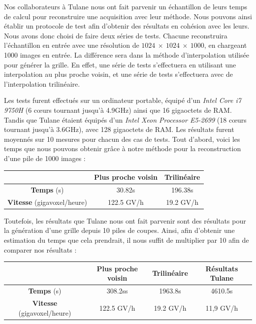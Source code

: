 {{{            Nos collaborateurs à Tulane nous ont fait parvenir un échantillon de leurs temps de calcul pour reconstruire une acquisition avec leur méthode. Nous pouvons ainsi établir un protocole de test afin d'obtenir des résultats en cohésion avec les leurs. Nous avons donc choisi de faire deux séries de tests. Chacune reconstruira l'échantillon en entrée avec une résolution de $1024~\times~1024~\times~1000$, en chargeant 1000 images en entrée. La différence sera dans la méthode d'interpolation utilisée pour générer la grille. En effet, une série de tests s'effectuera en utilisant une interpolation au plus proche voisin, et une série de tests s'effectuera avec de l'interpolation trilinéaire. 

            Les tests furent effectués sur un ordinateur portable, équipé d'un \textit{Intel Core i7 9750H} (6 c\oe{}urs tournant jusqu'à 4.9GHz) ainsi que 16 gigaoctets de RAM. Tandis que Tulane étaient équipés d'un \textit{Intel Xeon Processor E5-2699} (18 c\oe{}urs tournant jusqu'à 3.6GHz), avec 128 gigaoctets de RAM. Les résultats furent moyennés sur 10 mesures pour chacun des cas de tests. Tout d'abord, voici les temps que nous pouvons obtenir grâce à notre méthode pour la reconstruction d'une pile de 1000 images :\bigskip

            {
                \centering
                \begin{tabular}{|c|c|c|}
                    \hline
                    \textbf{ } & \textbf{Plus proche voisin} & \textbf{Trilinéaire} \\ \hline %
                    \textbf{Temps} (s) & 30.82s & 196.38s \\ \hline
                    \textbf{Vitesse} (gigavoxel/heure) & 122.5 GV/h & 19.2 GV/h \\
                    \hline
                \end{tabular}
            }\bigskip
            
            Toutefois, les résultats que Tulane nous ont fait parvenir sont des résultats pour la génération d'une grille depuis 10 piles de coupes. Ainsi, afin d'obtenir une estimation du temps que cela prendrait, il nous suffit de multiplier par 10 afin de comparer nos résultats :\bigskip

            {
                \centering
                \begin{tabular}{|c|c|c|c|}
                    \hline
                    \textbf{ } & \textbf{Plus proche voisin} & \textbf{Trilinéaire} & \textbf{Résultats Tulane} \\ \hline %
                    \textbf{Temps} (s) & 308.2ss & 1963.8s & 4610.5s \\ \hline
                    \textbf{Vitesse} (gigavoxel/heure) & 122.5 GV/h & 19.2 GV/h & 11,9 GV/h \\
                    \hline
                \end{tabular}
            }\bigskip

}}}
